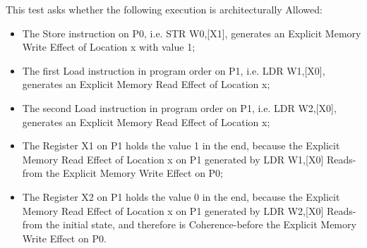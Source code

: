 This test asks whether the following execution is architecturally Allowed:

\begin{itemize}
  \item The Store instruction on P0, i.e. STR W0,[X1], generates an Explicit Memory Write Effect of Location x with value 1;
  \item The first Load instruction in program order on P1, i.e. LDR W1,[X0], generates an Explicit Memory Read Effect of Location x;
  \item The second Load instruction in program order on P1, i.e. LDR W2,[X0], generates an Explicit Memory Read Effect of Location x;
  \item The Register X1 on P1 holds the value 1 in the end, because the Explicit Memory Read Effect of Location x on P1 generated by LDR W1,[X0] Reads-from the Explicit Memory Write Effect on P0;
  \item The Register X2 on P1 holds the value 0 in the end, because the Explicit Memory Read Effect of Location x on P1 generated by LDR W2,[X0] Reads-from the initial state, and therefore is Coherence-before the Explicit Memory Write Effect on P0.
\end{itemize}
